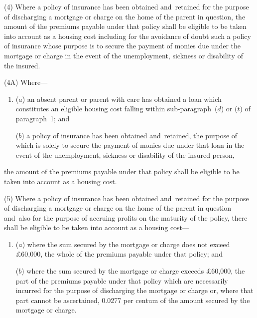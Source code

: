 \documentclass[12pt,a4paper]{article}
\begin{document}
(4) Where a policy of insurance has been obtained and~retained for the purpose of discharging a mortgage or charge on the home of the parent in question, the amount of the 
premiums payable  %
under that policy shall be eligible to be taken into account as a housing cost
including for the avoidance of doubt such a policy of insurance whose purpose is to secure the payment of monies due under the mortgage or charge in the event of the unemployment, sickness or disability of the insured.  %

(4A) Where—
\begin{enumerate}\item[]
($a$) an absent parent or parent with care has obtained a loan which constitutes an eligible housing cost falling within sub-paragraph~($d$) or ($t$) of paragraph~1; and

($b$) a policy of insurance has been obtained and~retained, the purpose of which is solely to secure the payment of monies due under that loan in the event of the unemployment, sickness or disability of the insured person,
\end{enumerate}
the amount of the premiums payable under that policy shall be eligible to be taken into account as a housing cost.


(5) Where a policy of insurance has been obtained and~retained for the purpose of discharging a mortgage or charge on the home of the parent in question and~also for the purpose of accruing profits on the maturity of the policy, there shall be eligible to be taken into account as a housing cost—
\begin{enumerate}\item[]
($a$) where the sum secured by the mortgage or charge does not exceed £60,000, the whole of the 
premiums payable  %
under that policy; and

($b$) where the sum secured by the mortgage or charge exceeds £60,000, the part of the 
premiums payable  %
under that policy which are necessarily incurred for the purpose of discharging the mortgage or charge or, where that part cannot be ascertained, 0$.$0277 per centum of the amount secured by the mortgage or charge.
\end{enumerate}
\end{document}
